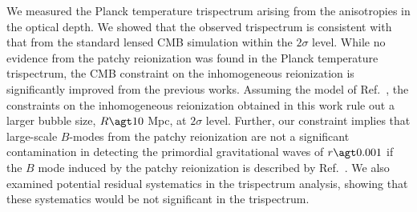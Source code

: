 \documentclass[aps,prd,twocolumn,superscriptaddress,groupedaddress,nofootinbib]{revtex4}
\begin{document}
We measured the Planck temperature trispectrum arising from the anisotropies in the optical depth. 
We showed that the observed trispectrum is consistent with that from the standard lensed CMB simulation 
within the $2\sigma$ level.
While no evidence from the patchy reionization was found in the Planck temperature trispectrum, 
the CMB constraint on the inhomogeneous reionization is significantly 
improved from the previous works. 
Assuming the model of Ref.~\cite{Wang:2006}, the constraints on the inhomogeneous reionization 
obtained in this work rule out a larger bubble size, $R\agt 10$ Mpc, at $2\sigma$ level. 
Further, our constraint implies that large-scale $B$-modes from the patchy reionization are not a significant 
contamination in detecting the primordial gravitational waves of $r\agt0.001$ 
if the $B$ mode induced by the patchy reionization is described by Ref.~\cite{Dvorkin:2009ah}.
We also examined potential residual systematics in the trispectrum analysis, showing that 
these systematics would be not significant in the trispectrum. 
\end{document}
